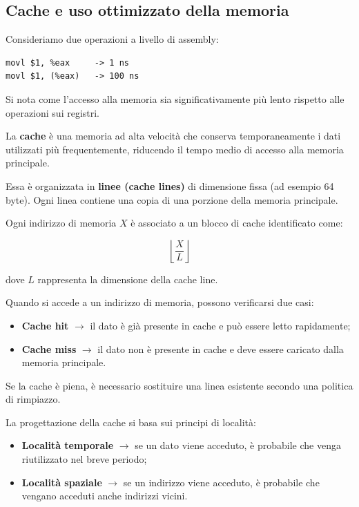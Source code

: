 \subsection{Cache e uso ottimizzato della memoria}
Consideriamo due operazioni a livello di assembly:
\begin{verbatim}
movl $1, %eax     -> 1 ns
movl $1, (%eax)   -> 100 ns
\end{verbatim}

\noindent
Si nota come l’accesso alla memoria sia significativamente più lento rispetto alle operazioni sui registri.

\medskip

\noindent La \textbf{cache} è una memoria ad alta velocità che conserva temporaneamente i dati utilizzati più frequentemente, riducendo il tempo medio di accesso alla memoria principale.

\noindent Essa è organizzata in \textbf{linee (cache lines)} di dimensione fissa (ad esempio 64 byte).  
Ogni linea contiene una copia di una porzione della memoria principale.

\bigskip

\noindent Ogni indirizzo di memoria \(X\) è associato a un blocco di cache identificato come:

\[
\left\lfloor \frac{X}{L} \right\rfloor
\]

\noindent dove \(L\) rappresenta la dimensione della cache line.

\medskip

\noindent Quando si accede a un indirizzo di memoria, possono verificarsi due casi:

\begin{itemize}
    \item \textbf{Cache hit} $\rightarrow$ il dato è già presente in cache e può essere letto rapidamente;

    \item \textbf{Cache miss} $\rightarrow$ il dato non è presente in cache e deve essere caricato dalla memoria principale.
\end{itemize}

\medskip

\noindent Se la cache è piena, è necessario sostituire una linea esistente secondo una politica di rimpiazzo.

\noindent La progettazione della cache si basa sui principi di località:

\begin{itemize}
    \item \textbf{Località temporale} $\rightarrow$ se un dato viene acceduto, è probabile che venga riutilizzato nel breve periodo;

    \item \textbf{Località spaziale} $\rightarrow$ se un indirizzo viene acceduto, è probabile che vengano acceduti anche indirizzi vicini.
\end{itemize}

